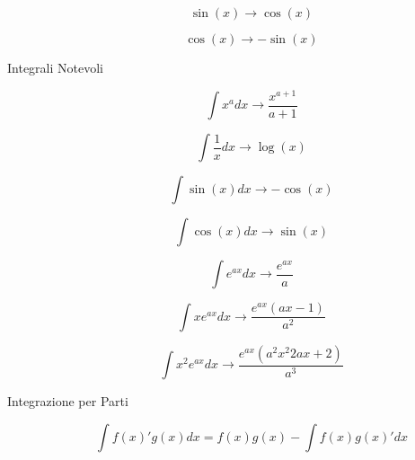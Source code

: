 \begin{description}
	\begin{equation}
	\sin(x) \rightarrow \cos(x)
	\end{equation}
	
	\begin{equation}
	\cos(x) \rightarrow -\sin(x)
	\end{equation}
	
	\item[Integrali Notevoli]
	\begin{equation}
	\int x^{a} dx \rightarrow \frac{x^{a+1}}{a+1}
	\end{equation}
	
	\begin{equation}
	\int \frac{1}{x} dx \rightarrow \log(x)
	\end{equation}
	
	\begin{equation}
	\int \sin(x) dx \rightarrow -\cos(x)
	\end{equation}
	
	\begin{equation}
	\int \cos(x) dx \rightarrow \sin(x)
	\end{equation}
	
	\begin{equation}
	\int e^{ax} dx \rightarrow \frac{e^{ax}}{a}
	\end{equation}
	
	\begin{equation}
	\int xe^{ax} dx \rightarrow \frac{e^{ax}(ax-1)}{a^{2}}
	\end{equation}
	
	\begin{equation}
	\int x^{2}e^{ax} dx \rightarrow \frac{e^{ax}(a^{2}x^{2}2ax+2)}{a^{3}}
	\end{equation}
	
	\item[Integrazione per Parti]
	\begin{equation}
	\int f(x)'g(x) dx = f(x)g(x) - \int f(x)g(x)'dx
	\end{equation}
	
\end{description}

\newpage

